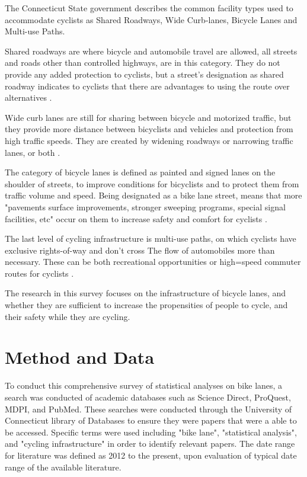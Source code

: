 \documentclass[12pt, letterpaper]{article}
\begin{document}
The Connecticut State government describes the common facility types used to accommodate cyclists as Shared Roadways, Wide Curb-lanes, Bicycle Lanes and Multi-use Paths.\par
Shared roadways are where bicycle and automobile travel are allowed, all streets and roads other than controlled highways, are in this category. They do not provide any added protection to cyclists, but a street's designation as shared roadway indicates to cyclists that there are advantages to using the route over alternatives \cite{CTDOT2023}. \par 
Wide curb lanes are still for sharing between bicycle and motorized traffic, but they provide more distance between bicyclists and vehicles and protection from high traffic speeds. They are created by widening roadways or narrowing traffic lanes, or both \cite{CTDOT2023}.\par 
The category of bicycle lanes is defined as painted and signed lanes on the shoulder of streets, to improve conditions for bicyclists and to protect them from traffic volume and speed. Being designated as a bike lane street, means that more "pavements surface improvements, stronger sweeping programs, special signal facilities, etc" occur on them to increase safety and comfort for cyclists \cite{CTDOT2023}. \par
The last level of cycling infrastructure is multi-use paths, on which cyclists have exclusive rights-of-way and don't cross The flow of automobiles more than necessary. These can be both recreational opportunities or high=speed commuter routes for cyclists \cite{CTDOT2023}. \par
The research in this survey focuses on the infrastructure of bicycle lanes, and whether they are sufficient to increase the propensities of people to cycle, and their safety while they are cycling. 


\section{Method and Data}
\label{sec:methodanddata}

To conduct this comprehensive survey of statistical analyses on bike lanes, a search was conducted of academic databases such as Science Direct, ProQuest, MDPI, and PubMed. These searches were conducted through the University of Connecticut library of Databases to ensure they were papers that were a able to be accessed. Specific terms were used including "bike lane", "statistical analysis", and "cycling infrastructure" in order to identify relevant papers. The date range for literature was defined as 2012 to the present, upon evaluation of typical date range of the available literature. \par
\end{document}
